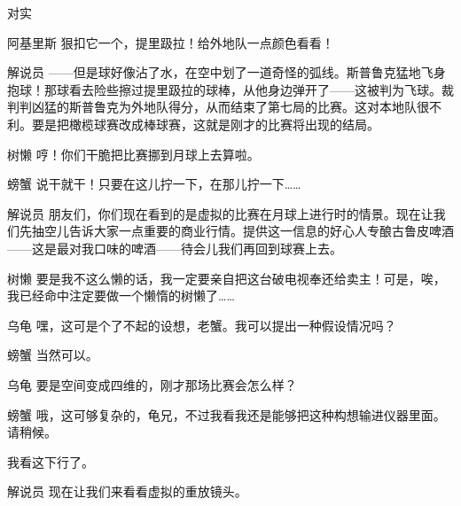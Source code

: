 \begin{dialog}{对实}
\begin{dialogue}
\item[阿基里斯]狠扣它一个，提里趿拉！给外地队一点颜色看看！

\item[解说员]——但是球好像沾了水，在空中划了一道奇怪的弧线。斯普鲁克猛地飞身抱球！那球看去险些擦过提里趿拉的球棒，从他身边弹开了——这被判为飞球。裁判判凶猛的斯普鲁克为外地队得分，从而结束了第七局的比赛。这对本地队很不利。要是把橄榄球赛改成棒球赛，这就是刚才的比赛将出现的结局。

\item[树懒]哼！你们干脆把比赛挪到月球上去算啦。

\item[螃蟹]说干就干！只要在这儿拧一下，在那儿拧一下……


\item[解说员]朋友们，你们现在看到的是虚拟的比赛在月球上进行时的情景。现在让我们先抽空儿告诉大家一点重要的商业行情。提供这一信息的好心人专酿古鲁皮啤酒——这是最对我口味的啤酒——待会儿我们再回到球赛上去。

\item[树懒]要是我不这么懒的话，我一定要亲自把这台破电视奉还给卖主！可是，唉，我已经命中注定要做一个懒惰的树懒了……


\item[乌龟]嘿，这可是个了不起的设想，老蟹。我可以提出一种假设情况吗？

\item[螃蟹]当然可以。

\item[乌龟]要是空间变成四维的，刚才那场比赛会怎么样？

\item[螃蟹]哦，这可够复杂的，龟兄，不过我看我还是能够把这种构想输进仪器里面。请稍候。


我看这下行了。

\item[解说员]现在让我们来看看虚拟的重放镜头。



\end{dialogue}
\end{dialog}
